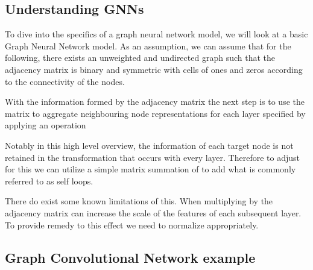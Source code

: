 \subsection{Understanding GNNs}

To dive into the specifics of a graph neural network model, we will look at a basic  Graph Neural Network model. As an assumption, we can assume that for the following, there exists an unweighted and undirected graph such that the adjacency matrix is binary and symmetric with cells of ones and zeros according to the connectivity of the nodes.


With the information formed by the adjacency matrix the next step is to use the matrix to aggregate neighbouring node representations for each layer specified by applying an operation



Notably in this high level overview, the information of each target node is not retained in the transformation that occurs with every layer. Therefore to adjust for this we can utilize a simple matrix summation of to add what is commonly referred to as self loops.



There do exist some known limitations of this. When multiplying by the adjacency matrix can increase the scale of the features of each subsequent layer. To provide remedy to this effect we need to normalize appropriately. \cite{sanchez2021gentle}




\subsection{Graph Convolutional Network example}

